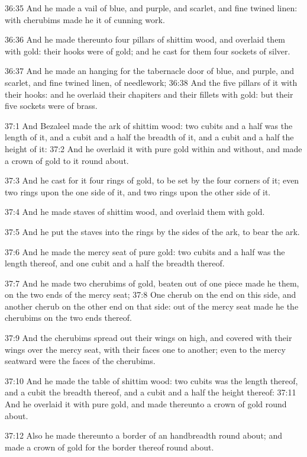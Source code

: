36:35 And he made a vail of blue, and purple, and scarlet, and fine
twined linen: with cherubims made he it of cunning work.

36:36 And he made thereunto four pillars of shittim wood, and overlaid
them with gold: their hooks were of gold; and he cast for them four
sockets of silver.

36:37 And he made an hanging for the tabernacle door of blue, and
purple, and scarlet, and fine twined linen, of needlework; 36:38 And
the five pillars of it with their hooks: and he overlaid their
chapiters and their fillets with gold: but their five sockets were of
brass.

37:1 And Bezaleel made the ark of shittim wood: two cubits and a half
was the length of it, and a cubit and a half the breadth of it, and a
cubit and a half the height of it: 37:2 And he overlaid it with pure
gold within and without, and made a crown of gold to it round about.

37:3 And he cast for it four rings of gold, to be set by the four
corners of it; even two rings upon the one side of it, and two rings
upon the other side of it.

37:4 And he made staves of shittim wood, and overlaid them with gold.

37:5 And he put the staves into the rings by the sides of the ark, to
bear the ark.

37:6 And he made the mercy seat of pure gold: two cubits and a half
was the length thereof, and one cubit and a half the breadth thereof.

37:7 And he made two cherubims of gold, beaten out of one piece made
he them, on the two ends of the mercy seat; 37:8 One cherub on the end
on this side, and another cherub on the other end on that side: out of
the mercy seat made he the cherubims on the two ends thereof.

37:9 And the cherubims spread out their wings on high, and covered
with their wings over the mercy seat, with their faces one to another;
even to the mercy seatward were the faces of the cherubims.

37:10 And he made the table of shittim wood: two cubits was the length
thereof, and a cubit the breadth thereof, and a cubit and a half the
height thereof: 37:11 And he overlaid it with pure gold, and made
thereunto a crown of gold round about.

37:12 Also he made thereunto a border of an handbreadth round about;
and made a crown of gold for the border thereof round about.

